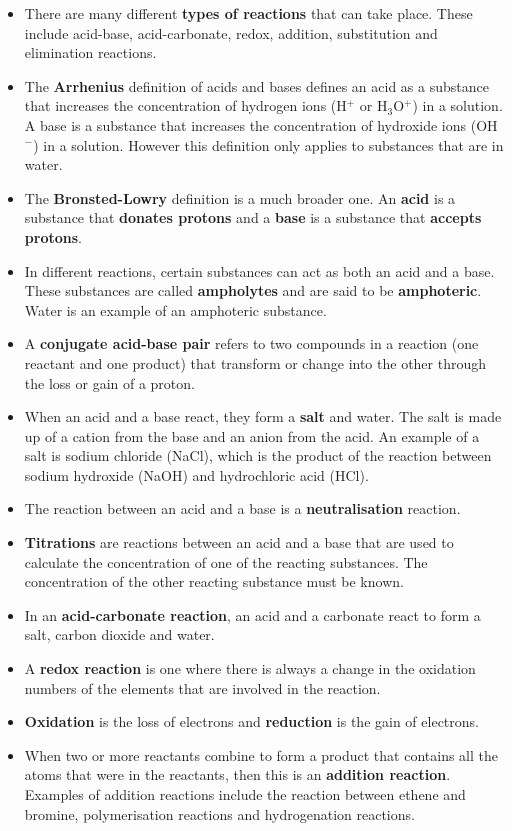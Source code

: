 \begin{itemize}
\item{There are many different \textbf{types of reactions} that can take place. These include acid-base, acid-carbonate, redox, addition, substitution and elimination reactions.}
\item{The \textbf{Arrhenius} definition of acids and bases defines an acid as a substance that increases the concentration of hydrogen ions (H$^{+}$ or H$_{3}$O$^{+}$) in a solution. A base is a substance that increases the concentration of hydroxide ions (OH$^{-}$) in a solution. However this definition only applies to substances that are in water.}
\item{The \textbf{Bronsted-Lowry} definition is a much broader one. An \textbf{acid} is a substance that \textbf{donates protons} and a \textbf{base} is a substance that \textbf{accepts protons}. }
\item{In different reactions, certain substances can act as both an acid and a base. These substances are called \textbf{ampholytes} and are said to be \textbf{amphoteric}. Water is an example of an amphoteric substance.}
\item{A \textbf{conjugate acid-base pair} refers to two compounds in a reaction (one reactant and one product) that transform or change into the other through the loss or gain of a proton.}
\item{When an acid and a base react, they form a \textbf{salt} and water. The salt is made up of a cation from the base and an anion from the acid. An example of a salt is sodium chloride (NaCl), which is the product of the reaction between sodium hydroxide (NaOH) and hydrochloric acid (HCl).}
\item{The reaction between an acid and a base is a \textbf{neutralisation} reaction.}
\item{\textbf{Titrations} are reactions between an acid and a base that are used to calculate the concentration of one of the reacting substances. The concentration of the other reacting substance must be known.}
\item{In an \textbf{acid-carbonate reaction}, an acid and a carbonate react to form a salt, carbon dioxide and water.}
\item{A \textbf{redox reaction} is one where there is always a change in the oxidation numbers of the elements that are involved in the reaction.}
\item{\textbf{Oxidation} is the loss of electrons and \textbf{reduction} is the gain of electrons.}
\item{When two or more reactants combine to form a product that contains all the atoms that were in the reactants, then this is an \textbf{addition reaction}. Examples of addition reactions include the reaction between ethene and bromine, polymerisation reactions and hydrogenation reactions.}

\end{itemize}
